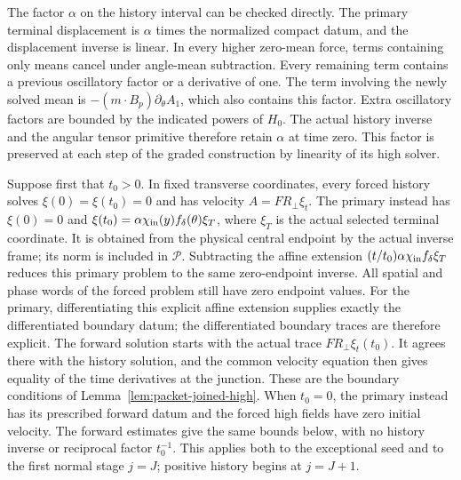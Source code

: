 The factor $\alpha$ on the history interval can be checked directly.
The primary terminal displacement is $\alpha$ times the normalized compact
datum, and the displacement inverse is linear. In every higher zero-mean
force, terms containing only means cancel under angle-mean subtraction.
Every remaining term contains a previous oscillatory factor or a derivative
of one. The term involving the newly solved mean is
$-(m\cdot B_p)\partial_\theta A_1$, which also contains this factor.
Extra oscillatory factors are bounded by the indicated powers of $H_0$.
The actual history inverse and the angular tensor primitive therefore
retain $\alpha$ at time zero. This factor is preserved at each step of the graded construction
by linearity of its high solver.

Suppose first that $t_0>0$. In fixed transverse coordinates, every
forced history solves
$\xi(0)=\xi(t_0)=0$ and has velocity $A=FR_\perp\xi_t$.
The primary instead has $\xi(0)=0$ and
$\xi(t_0)=\alpha\chi_{\rm in}(y)f_\delta(\theta)\xi_T$, where $\xi_T$ is the
actual selected terminal coordinate. It is obtained from the physical
central endpoint by the actual inverse frame; its norm is included in $\mathcal P$.
Subtracting the affine extension
$(t/t_0)\alpha\chi_{\rm in}f_\delta\xi_T$ reduces this primary problem to the
same zero-endpoint inverse. All spatial and phase words of the forced
problem still have zero endpoint values. For the primary, differentiating
this explicit affine extension supplies exactly the differentiated
boundary datum; the differentiated boundary traces are therefore explicit.
The forward solution starts with the actual trace $FR_\perp\xi_t(t_0)$.
It agrees there with the history solution, and the common velocity equation
then gives equality of the time derivatives at the junction. These are
the boundary conditions of Lemma~\ref{lem:packet-joined-high}.
When $t_0=0$, the primary instead has its prescribed forward datum
and the forced high fields have zero initial velocity. The forward
estimates give the same bounds below, with no history inverse or
reciprocal factor $t_0^{-1}$. This applies both to the exceptional seed
and to the first normal stage $j=J$; positive history begins at $j=J+1$.

